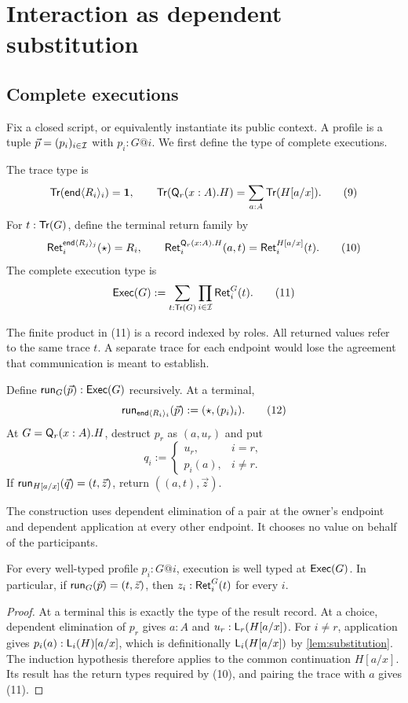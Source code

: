 \section{Interaction as dependent substitution}
\label{sec:interaction}

\subsection{Complete executions}

Fix a closed script, or equivalently instantiate its public context. A profile
is a tuple $\vec p=(p_i)_{i\in\mathcal I}$ with $p_i:G@i$.
We first define the type of complete executions.

\begin{definition}
The trace type is
\[
 \mathsf{Tr}(\mathsf{end}\langle R_i\rangle_i)=\mathbf 1,
 \qquad
 \mathsf{Tr}(\mathsf Q_r(x:A).H)=\sum_{a:A}\mathsf{Tr}(H[a/x]).
 \tag{9}
\]
For $t:\mathsf{Tr}(G)$, define the terminal return family by
\[
 \mathsf{Ret}_i^{\mathsf{end}\langle R_j\rangle_j}(\star)=R_i,
 \qquad
 \mathsf{Ret}_i^{\mathsf Q_r(x:A).H}(a,t)=\mathsf{Ret}_i^{H[a/x]}(t).
 \tag{10}
\]
The complete execution type is
\[
 \mathsf{Exec}(G):=\sum_{t:\mathsf{Tr}(G)}\prod_{i\in\mathcal I}\mathsf{Ret}_i^G(t).
 \tag{11}
\]
\end{definition}

The finite product in (11) is a record indexed by roles. All returned values
refer to the same trace $t$. A separate trace for each endpoint would lose the
agreement that communication is meant to establish.

\begin{definition}[Execution]
\label{def:execution}
Define $\mathsf{run}_G(\vec p):\mathsf{Exec}(G)$ recursively. At a terminal,
\[
 \mathsf{run}_{\mathsf{end}\langle R_i\rangle_i}(\vec p)
       :=(\star,(p_i)_i).
 \tag{12}
\]
At $G=\mathsf Q_r(x:A).H$, destruct $p_r$ as $(a,u_r)$ and put
\[
 q_i:=
 \begin{cases}
   u_r,&i=r,\\
   p_i(a),&i\ne r.
 \end{cases}
 \tag{13}
\]
If $\mathsf{run}_{H[a/x]}(\vec q)=(t,\vec z)$, return
$((a,t),\vec z)$.
\end{definition}

The construction uses dependent elimination of a pair at the owner's endpoint
and dependent application at every other endpoint. It chooses no value on
behalf of the participants.

\begin{theorem}
\label{thm:interaction}
For every well-typed profile $p_i:G@i$, execution is well typed at $\mathsf{Exec}(G)$.
In particular, if $\mathsf{run}_G(\vec p)=(t,\vec z)$, then
$z_i:\mathsf{Ret}_i^G(t)$ for every $i$.
\end{theorem}
\begin{proof}
At a terminal this is exactly the type of the result record. At a choice,
dependent elimination of $p_r$ gives $a:A$ and $u_r:\mathsf L_{r}(H[a/x])$.
For $i\ne r$, application gives
$p_i(a):\mathsf L_{i}(H)[a/x]$, which is definitionally
$\mathsf L_{i}(H[a/x])$ by \cref{lem:substitution}.
The induction hypothesis therefore applies to the common continuation
$H[a/x]$. Its result has the return types required by (10), and pairing the
trace with $a$ gives (11).
\end{proof}

